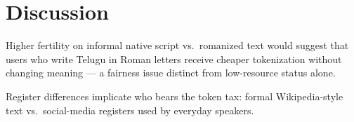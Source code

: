 \section{Discussion}

Higher fertility on informal native script vs.\ romanized text would suggest
that users who write Telugu in Roman letters receive cheaper tokenization
without changing meaning --- a fairness issue distinct from low-resource
status alone.

Register differences implicate who bears the token tax: formal Wikipedia-style
text vs.\ social-media registers used by everyday speakers.
